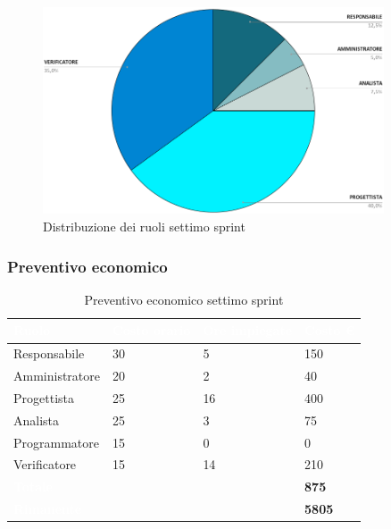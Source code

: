\begin{figure}[h!]
    \centering
    \includegraphics[width=0.9\textwidth]{prev7ruoli.png}
    \caption{Distribuzione dei ruoli settimo sprint}
    \label{fig:preventivoorariosettimosprint}
\end{figure}

\subsubsection{Preventivo economico}
{
\setlength{\tabcolsep}{10pt}
\renewcommand{\arraystretch}{1.5}
\begin{table}[h]
    \centering
    \begin{tabularx}{\textwidth}{| l | l | l | X |}
        \hline
        \rowcolor{headerrow} \textbf{\textcolor{white}{Ruolo}} & \textbf{\textcolor{white}{Costo orario}} & \textbf{\textcolor{white}{Ore impiegate}} & \textbf{\textcolor{white}{Costo €}} \\
        \hline
        Responsabile & 30 & 5 & 150\\
        \hline
        Amministratore & 20 & 2 & 40\\
        \hline
        Progettista& 25 & 16 & 400\\
        \hline
        Analista & 25 & 3 & 75\\
        \hline
        Programmatore & 15 & 0 & 0\\
        \hline
        Verificatore & 15 & 14 & 210\\
        \hline
        \cellcolor{headerrow} \textbf{\textcolor{white}{Totale}} &  &  & \textbf{875}\\
        \hline
        \cellcolor{headerrow} \textbf{\textcolor{white}{Rimanente}} &  &  & \textbf{5805}\\
        \hline
    \end{tabularx}
    \caption{Preventivo economico settimo sprint}
    \label{tab:preventivocostisettimosprint}
\end{table}
}

